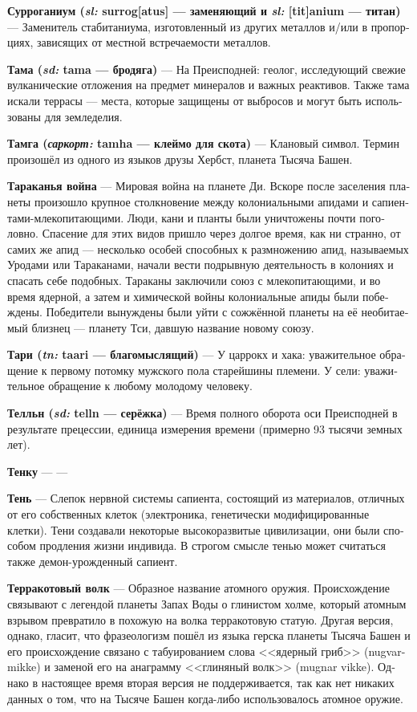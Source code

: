 \documentclass[a4paper,12pt,fleqn]{book}\usepackage{polyglossia}\setdefaultlanguage[babelshorthands=true]{russian}\setotherlanguage{english}\defaultfontfeatures{Ligatures=TeX,Mapping=tex-text}\usepackage{xcolor}\newcommand{\ml}[3]{#2}
\newcommand{\theterm}[3]{\textbf{\hypertarget{#1}{#2}} --- #3}
\newcommand{\theorigin}[3]{\textit{#1:} #2 --- #3}
\begin{document}
{\theterm{surroganium}
{Сурроганиум (\theorigin{sl}{surrog[atus]}{заменяющий} и \theorigin{sl}{[tit]anium}{титан})}
{Заменитель стабитаниума, изготовленный из других металлов и/или в пропорциях, зависящих от местной встречаемости металлов.}

\theterm{tama}
{Тама (\theorigin{sd}{tama}{бродяга})}
{На Преисподней: геолог, исследующий свежие вулканические отложения на предмет минералов и важных реактивов.
Также тама искали террасы --- места, которые защищены от выбросов и могут быть использованы для земледелия.}

\theterm{tamja}
{Тамга (\theorigin{саркорт}{tamha}{клеймо для скота})}
{Клановый символ.
Термин произошёл из одного из языков друзы Хербст, планета Тысяча Башен.}

\theterm{cockroach-war}
{Тараканья война}
{Мировая война на планете Ди.
Вскоре после заселения планеты произошло крупное столкновение между колониальными апидами и сапиентами-млекопитающими.
Люди, кани и планты были уничтожены почти поголовно.
Спасение для этих видов пришло через долгое время, как ни странно, от самих же апид --- несколько особей способных к размножению апид, называемых Уродами или Тараканами, начали вести подрывную деятельность в колониях и спасать себе подобных.
Тараканы заключили союз с млекопитающими, и во время ядерной, а затем и химической войны колониальные апиды были побеждены.
Победители вынуждены были уйти с сожжённой планеты на её необитаемый близнец --- планету Тси, давшую название новому союзу.}

\theterm{taari}
{Тари (\theorigin{tn}{taari}{благомыслящий})}
{У царрокх и хака: уважительное обращение к первому потомку мужского пола старейшины племени.
У сели: уважительное обращение к любому молодому человеку.}

\theterm{telln}
{Телльн (\theorigin{sd}{telln}{серёжка})}
{Время полного оборота оси Преисподней в результате прецессии, единица измерения времени (примерно 93 тысячи земных лет).}

\theterm{technku} %
{Тенку}
{---}

\theterm{shadow}
{Тень}
{Слепок нервной системы сапиента, состоящий из материалов, отличных от его собственных клеток (электроника, генетически модифицированные клетки).
Тени создавали некоторые высокоразвитые цивилизации, они были способом продления жизни индивида.
В строгом смысле тенью может считаться также демон-урожденный сапиент.}

\theterm{terracota-wolf}
{Терракотовый волк}
{Образное название атомного оружия.
Происхождение связывают с легендой планеты Запах Воды о глинистом холме, который атомным взрывом превратило в похожую на волка терракотовую статую.
Другая версия, однако, гласит, что фразеологизм пошёл из языка герска планеты Тысяча Башен и его происхождение связано с табуированием слова <<ядерный гриб>> (nugvar-mikke) и заменой его на анаграмму <<глиняный волк>> (mugnar vikke).
Однако в настоящее время вторая версия не поддерживается, так как нет никаких данных о том, что на Тысяче Башен когда-либо использовалось атомное оружие.}

}
\end{document}
